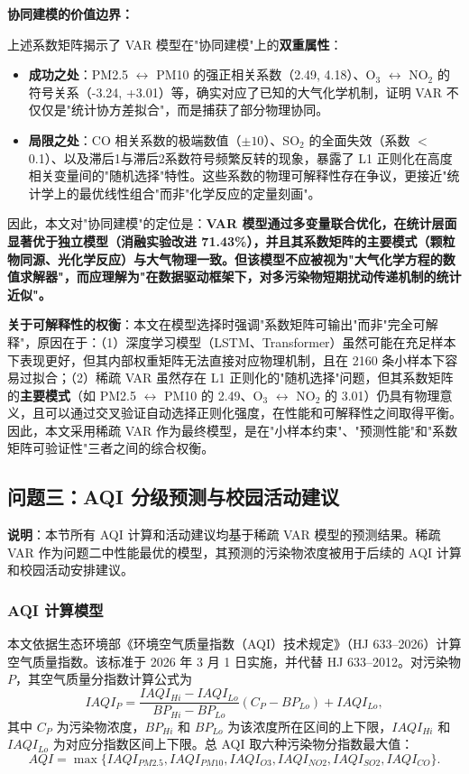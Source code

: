 \documentclass[UTF8,a4paper,12pt]{ctexart}
\begin{document}
\textbf{协同建模的价值边界：}

上述系数矩阵揭示了 VAR 模型在"协同建模"上的\textbf{双重属性}：

\begin{itemize}[nosep]
  \item \textbf{成功之处}：PM2.5 $\leftrightarrow$ PM10 的强正相关系数（2.49, 4.18）、O$_3$ $\leftrightarrow$ NO$_2$ 的符号关系（-3.24, +3.01）等，确实对应了已知的大气化学机制，证明 VAR 不仅仅是"统计协方差拟合"，而是捕获了部分物理协同。
  \item \textbf{局限之处}：CO 相关系数的极端数值（$\pm 10$）、SO$_2$ 的全面失效（系数 $<$ 0.1）、以及滞后1与滞后2系数符号频繁反转的现象，暴露了 L1 正则化在高度相关变量间的"随机选择"特性。这些系数的物理可解释性存在争议，更接近"统计学上的最优线性组合"而非"化学反应的定量刻画"。
\end{itemize}

因此，本文对"协同建模"的定位是：\textbf{VAR 模型通过多变量联合优化，在统计层面显著优于独立模型（消融实验改进 71.43\%），并且其系数矩阵的主要模式（颗粒物同源、光化学反应）与大气物理一致。但该模型不应被视为"大气化学方程的数值求解器"，而应理解为"在数据驱动框架下，对多污染物短期扰动传递机制的统计近似"。}

\textbf{关于可解释性的权衡}：本文在模型选择时强调"系数矩阵可输出"而非"完全可解释"，原因在于：（1）深度学习模型（LSTM、Transformer）虽然可能在充足样本下表现更好，但其内部权重矩阵无法直接对应物理机制，且在 2160 条小样本下容易过拟合；（2）稀疏 VAR 虽然存在 L1 正则化的"随机选择"问题，但其系数矩阵的\textbf{主要模式}（如 PM2.5 $\leftrightarrow$ PM10 的 2.49、O$_3$ $\leftrightarrow$ NO$_2$ 的 3.01）仍具有物理意义，且可以通过交叉验证自动选择正则化强度，在性能和可解释性之间取得平衡。因此，本文采用稀疏 VAR 作为最终模型，是在"小样本约束"、"预测性能"和"系数矩阵可验证性"三者之间的综合权衡。

\subsection{问题三：AQI 分级预测与校园活动建议}

\textbf{说明}：本节所有 AQI 计算和活动建议均基于稀疏 VAR 模型的预测结果。稀疏 VAR 作为问题二中性能最优的模型，其预测的污染物浓度被用于后续的 AQI 计算和校园活动安排建议。

\subsubsection{AQI 计算模型}

本文依据生态环境部《环境空气质量指数（AQI）技术规定》（HJ 633--2026）计算空气质量指数。该标准于 2026 年 3 月 1 日实施，并代替 HJ 633--2012。对污染物 $P$，其空气质量分指数计算公式为
\begin{equation}
\label{eq:iaqi}
IAQI_P=\frac{IAQI_{Hi}-IAQI_{Lo}}{BP_{Hi}-BP_{Lo}}(C_P-BP_{Lo})+IAQI_{Lo},
\end{equation}
其中 $C_P$ 为污染物浓度，$BP_{Hi}$ 和 $BP_{Lo}$ 为该浓度所在区间的上下限，$IAQI_{Hi}$ 和 $IAQI_{Lo}$ 为对应分指数区间上下限。总 AQI 取六种污染物分指数最大值：
\begin{equation}
\label{eq:aqi_max}
AQI=\max\{IAQI_{PM2.5},IAQI_{PM10},IAQI_{O3},IAQI_{NO2},IAQI_{SO2},IAQI_{CO}\}.
\end{equation}
\end{document}
